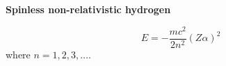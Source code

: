 {\bf Spinless non-relativistic hydrogen}

\begin{equation}
E = - \frac{mc^2}{2n^2} (Z\alpha)^2
\end{equation}
where $n=1,2,3,\ldots$.
